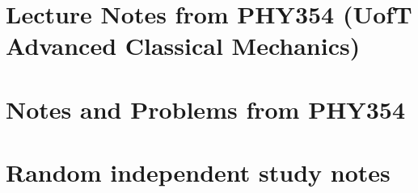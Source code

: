 \part{Lecture Notes from PHY354 (UofT Advanced Classical Mechanics)}
   
   
   
   

\part{Notes and Problems from PHY354}
   

\part{Random independent study notes}
   
   
   
   
   
   
   
   
   
   
   
   
   
   


